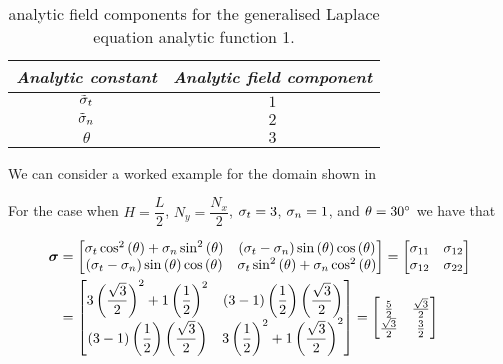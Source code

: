 \begin{table}[htb] \centering
  \begin{tabular}{|c|c|} \hline
    \emph{Analytic constant} & \emph{Analytic field component} \\ \hline \hline
    $\tilde{ \sigma }_{t}$ & $1$ \\ 
    $\tilde{ \sigma }_{n}$ & $2$ \\
    $\theta$ & $3$ \\ \hline
  \end{tabular}
  \caption{\OpenCMISS analytic field components for the \twod generalised Laplace equation
    analytic function 1.}
  \label{tab:OpenCMISSAnalyticFieldGeneralisedLaplaceEquationTwoDim1}
\end{table}

We can consider a worked example for the domain shown in 


For the case when $H=\dfrac{L}{2}$, $N_{y}=\dfrac{N_{x}}{2}$, $ \sigma _{t}=3$, $ \sigma _{n}=1$, and $\theta=30^{\circ}$ we have that

\begin{align}
  \conductivitytensor&=\begin{bmatrix}
  \conductivitytensorsymbol_{t}\cosinesq{\theta}+\conductivitytensorsymbol_{n}\sinesq{\theta} & 
  \pbrac{\conductivitytensorsymbol_{t}-\conductivitytensorsymbol_{n}}\sine{\theta}\cosine{\theta} \\
  \pbrac{\conductivitytensorsymbol_{t}-\conductivitytensorsymbol_{n}}\sine{\theta}\cosine{\theta} &
  \conductivitytensorsymbol_{t}\sinesq{\theta}+\conductivitytensorsymbol_{n}\cosinesq{\theta}
  \end{bmatrix} = \begin{bmatrix}
    \conductivitytensorsymbol_{11} & \conductivitytensorsymbol_{12} \\
    \conductivitytensorsymbol_{12} & \conductivitytensorsymbol_{22} 
  \end{bmatrix} \\
  &=\begin{bmatrix}
  3\pbrac{\dfrac{\sqrt{3}}{2}}^{2}+1\pbrac{\dfrac{1}{2}}^{2} & 
  \pbrac{3-1}\pbrac{\dfrac{1}{2}}\pbrac{\dfrac{\sqrt{3}}{2}} \\
  \pbrac{3-1}\pbrac{\dfrac{1}{2}}\pbrac{\dfrac{\sqrt{3}}{2}} &
  3\pbrac{\dfrac{1}{2}}^{2}+1\pbrac{\dfrac{\sqrt{3}}{2}}^{2}
  \end{bmatrix} = \begin{bmatrix}
    \frac{5}{2} & \frac{\sqrt{3}}{2} \\
    \frac{\sqrt{3}}{2} & \frac{3}{2}
  \end{bmatrix} 
  \label{eqn:FEMTwoDGenLaplaceDomainConductivity}
\end{align}

